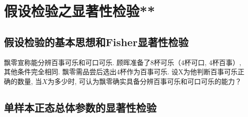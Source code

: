 \section{假设检验之显著性检验**}
\subsection{假设检验的基本思想和Fisher显著性检验}
\begin{example}
    飘零宣称能分辨百事可乐和可口可乐.
    顾晖准备了$8$杯可乐（$4$杯可口, $4$杯百事）, 其他条件完全相同.
    飘零需品尝后选出$4$杯作为百事可乐.
    设X为他判断百事可乐正确的数量, 当$X$为多少时, 可认为飘零确实具备分辨百事可乐和可口可乐的能力？
\end{example}
\clearpage
\subsection{单样本正态总体参数的显著性检验}
\clearpage

